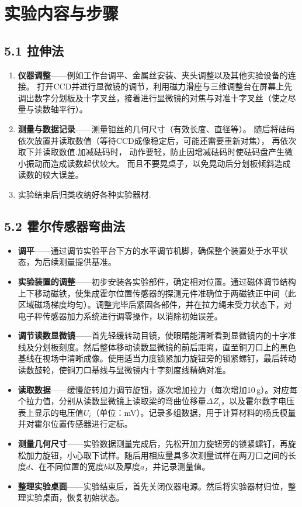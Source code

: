 \documentclass[11pt]{article}
\begin{document}
\section{实验内容与步骤}
\subsection*{5.1 拉伸法}
\begin{enumerate}
\item \textbf{仪器调整}——例如工作台调平、金属丝安装、夹头调整以及其他实验设备的连接。
打开CCD并进行显微镜的调节，利用磁力滑座与三维调整台在屏幕上先调出数字分划板及十字叉丝，接着进行显微镜的对焦与对准十字叉丝（使之尽量与读数轴平行）。

\item \textbf{测量与数据记录}——测量钼丝的几何尺寸（有效长度、直径等）。
随后将砝码依次放置并读取数值（等待CCD成像稳定后，可能还需要重新对焦），
再依次取下并读取数值.加减砝码时，
动作要轻，防止因增减砝码时使砝码盘产生微小振动而造成读数起伏较大。
而且不要晃桌子，以免晃动后分划板倾斜造成读数的较大误差。

\item 实验结束后归类收纳好各种实验器材.
\end{enumerate}

\subsection*{5.2 霍尔传感器弯曲法}
\begin{itemize}
    \item \textbf{调平}——通过调节实验平台下方的水平调节机脚，确保整个装置处于水平状态，为后续测量提供基准。

    \item \textbf{实验装置的调整}——初步安装各实验部件，确定相对位置。通过磁体调节结构上下移动磁铁，使集成霍尔位置传感器的探测元件准确位于两磁铁正中间（此区域磁场梯度均匀）。调整完毕后紧固各部件，并在拉力绳未受力状态下，对电子秤传感器加力系统进行调零操作，以消除初始误差。

    \item \textbf{调节读数显微镜}——首先轻缓转动目镜，使眼睛能清晰看到显微镜内的十字准线及分划板刻度。然后整体移动读数显微镜的前后距离，直至铜刀口上的黑色基线在视场中清晰成像。使用适当力度锁紧加力旋钮旁的锁紧螺钉，最后转动读数鼓轮，使铜刀口基线与显微镜内十字刻度线精确对准。
    \item \textbf{读取数据}——缓慢旋转加力调节旋钮，逐次增加拉力（每次增加10\,g）。对应每个拉力值，分别从读数显微镜上读取梁的弯曲位移量$\Delta Z_i$，以及霍尔数字电压表上显示的电压值$U_i$（单位：mV）。记录多组数据，用于计算材料的杨氏模量并对霍尔位置传感器进行定标。

    \item \textbf{测量几何尺寸}——实验数据测量完成后，先松开加力旋钮旁的锁紧螺钉，再旋松加力旋钮，小心取下试样。随后用相应量具多次测量试样在两刀口之间的长度$d$、在不同位置的宽度$b$以及厚度$a$，并记录测量值。

    \item \textbf{整理实验桌面}——实验结束后，首先关闭仪器电源。然后将实验器材归位，整理实验桌面，恢复初始状态。
\end{itemize}
\end{document}
